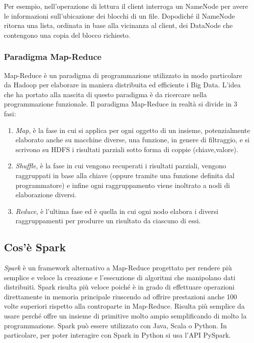 \documentclass[titlepage]{article}
\begin{document}
Per esempio, nell'operazione di lettura il client interroga un NameNode per avere le informazioni sull'ubicazione dei blocchi di un file. Dopodiché il NameNode ritorna una lista, ordinata in base alla vicinanza al client, dei DataNode che contengono una copia del blocco richiesto.

\subsubsection{Paradigma Map-Reduce}
Map-Reduce è un paradigma di programmazione utilizzato in modo particolare da Hadoop per elaborare in maniera distribuita ed efficiente i Big Data. L'idea che ha portato alla nascita di questo paradigma è da ricercare nella programmazione funzionale. Il paradigma Map-Reduce in realtà si divide in 3 fasi:
\begin{enumerate}
    \item \textit{Map}, è la fase in cui si applica per ogni oggetto di un insieme, potenzialmente elaborato anche su macchine diverse, una funzione, in genere di filtraggio, e si scrivono su HDFS i risultati parziali sotto forma di coppie (chiave,valore).
    \item \textit{Shuffle}, è la fase in cui vengono recuperati i risultati parziali, vengono raggruppati in base alla chiave (oppure tramite una funzione definita dal programmatore) e infine ogni raggruppamento viene inoltrato a nodi di elaborazione diversi.
    \item \textit{Reduce}, è l'ultima fase ed è quella in cui ogni nodo elabora i diversi raggruppamenti per produrre un risultato da ciascuno di essi.
\end{enumerate}

\subsection{Cos'è Spark}
\textit{Spark} è un framework alternativo a Map-Reduce progettato per rendere più semplice e veloce la creazione e l'esecuzione di algoritmi che manipolano dati distribuiti. Spark risulta più veloce poiché è in grado di effettuare operazioni direttamente in memoria principale riuscendo ad offrire prestazioni anche 100 volte superiori rispetto alla controparte in Map-Reduce. Risulta più semplice da usare perché offre un insieme di primitive molto ampio semplificando di molto la programmazione. Spark può essere utilizzato con Java, Scala o Python. In particolare, per poter interagire con Spark in Python si usa l'API PySpark.
\end{document}
